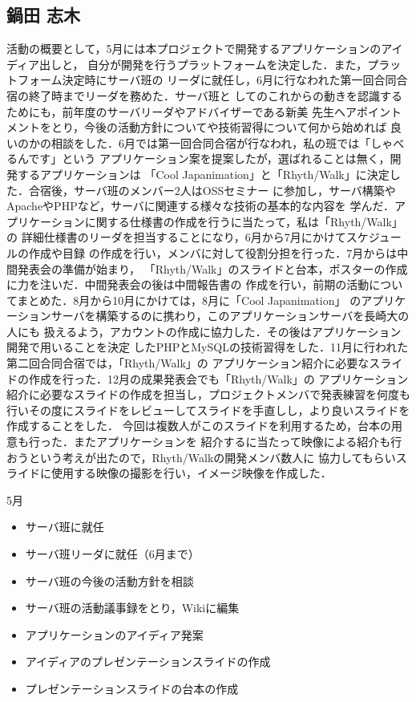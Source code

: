 \subsection{鍋田 志木}
\par
活動の概要として，5月には本プロジェクトで開発するアプリケーションのアイディア出しと，
自分が開発を行うプラットフォームを決定した．また，プラットフォーム決定時にサーバ班の
リーダに就任し，6月に行なわれた第一回合同合宿の終了時までリーダを務めた．サーバ班と
してのこれからの動きを認識するためにも，前年度のサーバリーダやアドバイザーである新美
先生へアポイントメントをとり，今後の活動方針についてや技術習得について何から始めれば
良いのかの相談をした．6月では第一回合同合宿が行なわれ，私の班では「しゃべるんです」という
アプリケーション案を提案したが，選ばれることは無く，開発するアプリケーションは
「Cool Japanimation」と「Rhyth/Walk」に決定した．合宿後，サーバ班のメンバー2人はOSSセミナー
に参加し，サーバ構築やApacheやPHPなど，サーバに関連する様々な技術の基本的な内容を
学んだ．アプリケーションに関する仕様書の作成を行うに当たって，私は「Rhyth/Walk」の
詳細仕様書のリーダを担当することになり，6月から7月にかけてスケジュールの作成や目録
の作成を行い，メンバに対して役割分担を行った．7月からは中間発表会の準備が始まり，
「Rhyth/Walk」のスライドと台本，ポスターの作成に力を注いだ．中間発表会の後は中間報告書の
作成を行い，前期の活動についてまとめた．8月から10月にかけては，8月に「Cool Japanimation」
のアプリケーションサーバを構築するのに携わり，このアプリケーションサーバを長崎大の人にも
扱えるよう，アカウントの作成に協力した．その後はアプリケーション開発で用いることを決定
したPHPとMySQLの技術習得をした．11月に行われた第二回合同合宿では，「Rhyth/Walk」の
アプリケーション紹介に必要なスライドの作成を行った．12月の成果発表会でも「Rhyth/Walk」の
アプリケーション紹介に必要なスライドの作成を担当し，プロジェクトメンバで発表練習を何度も
行いその度にスライドをレビューしてスライドを手直しし，より良いスライドを作成することをした．
今回は複数人がこのスライドを利用するため，台本の用意も行った．またアプリケーションを
紹介するに当たって映像による紹介も行おうという考えが出たので，Rhyth/Walkの開発メンバ数人に
協力してもらいスライドに使用する映像の撮影を行い，イメージ映像を作成した．
\par
5月
\begin{itemize}
\item サーバ班に就任
\item サーバ班リーダに就任（6月まで）
\item サーバ班の今後の活動方針を相談
\item サーバ班の活動議事録をとり，Wikiに編集
\item アプリケーションのアイディア発案
\item アイディアのプレゼンテーションスライドの作成
\item プレゼンテーションスライドの台本の作成
\end{itemize}

